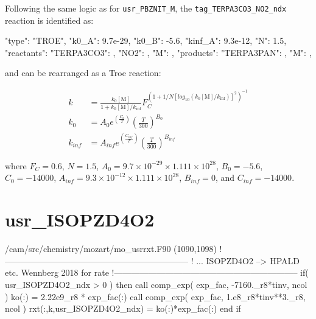 \documentclass[titlepage]{article}
\begin{document}
Following the same logic as for \verb>usr_PBZNIT_M>, the \verb>tag_TERPA3CO3_NO2_ndx> reaction is identified as:

\begin{blockcode}
        {
          "type": "TROE",
          "k0_A": 9.7e-29,
          "k0_B": -5.6,
          "kinf_A": 9.3e-12,
          "N": 1.5,
          "reactants": {
            "TERPA3CO3": { },
            "NO2": { },
            "M": { }
          },
          "products": {
            "TERPA3PAN": { },
            "M": { }
          }
        },
\end{blockcode}

\noindent and can be rearranged as a Troe reaction:

\begin{equation}
\begin{split}
k & = \frac{k_0[\mbox{M}]}{1+k_0[\mbox{M}]/k_{\inf}}F_C^{(1+1/N[log_{10}(k_0[\mbox{M}]/k_{\inf})]^2)^{-1}} \\
k_0 & = A_0 e^{\left( \frac{C_0}{T} \right)} \left( \frac{T}{300} \right)^{B_0} \\
k_{inf} & = A_{inf} e^{\left( \frac{C_{inf}}{T} \right)} \left( \frac{T}{300} \right)^{B_{inf}}
\end{split}
\end{equation}

\noindent where $F_C = 0.6$, $N = 1.5$, $A_0 = 9.7 \times 10^{-29} \times 1.111 \times 10^{28}$, $B_0 = -5.6$, $C_0 = -14000$, $A_{inf} = 9.3 \times 10^{-12} \times 1.111 \times 10^{28}$, $B_{inf} = 0$, and $C_{inf} = -14000$.


\section{usr\_ISOPZD4O2}

\begin{blockcode}[commandchars=\\\{\}]
\color{gray}/cam/src/chemistry/mozart/mo_usrrxt.F90 (1090,1098)
!-----------------------------------------------------------------
!       ... ISOPZD4O2 --> HPALD etc. Wennberg 2018 for rate
!-----------------------------------------------------------------
       if( usr_ISOPZD4O2_ndx > 0 ) then
          call comp_exp( exp_fac, -7160._r8*tinv, ncol )
          ko(:) = 2.22e9_r8 * exp_fac(:)
          call comp_exp( exp_fac, 1.e8_r8*tinv**3._r8, ncol )
          rxt(:,k,usr_ISOPZD4O2_ndx) = ko(:)*exp_fac(:)
       end if
\end{blockcode}
\end{document}
